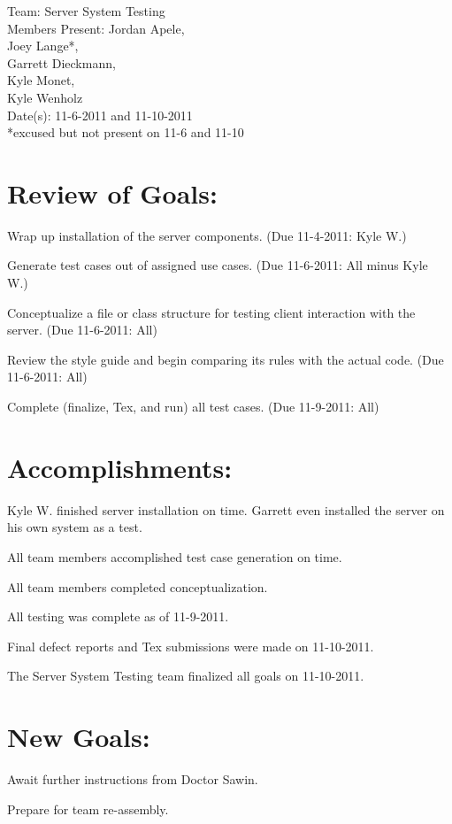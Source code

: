 \documentclass[12pt]{article}
\newenvironment{itemize*}%
{\begin{itemize}%
    \setlength{\parsep}{0pt}
    \setlength{\itemsep}{0pt}%
    \setlength{\parskip}{0pt}}%
{\end{itemize}}
\begin{document}
\thispagestyle{plain}
\begin{flushleft}
\singlespacing
Team: Server System Testing\\
Members Present: Jordan Apele,\\
Joey Lange*,\\
Garrett Dieckmann,\\
Kyle Monet,\\
Kyle Wenholz\\
Date(s): 11-6-2011 and 11-10-2011\\
*excused but not present on 11-6 and 11-10
\end{flushleft}
\pagestyle{fancy}
\section*{Review of Goals:}
\begin{itemize*}
\item Wrap up installation of the server components. (Due 11-4-2011: Kyle W.)
\item Generate test cases out of assigned use cases. (Due 11-6-2011: All minus Kyle W.)
\item Conceptualize a file or class structure for testing client interaction with the server. (Due 11-6-2011: All)
\item Review the style guide and begin comparing its rules with the actual code. (Due 11-6-2011: All)
\item Complete (finalize, Tex, and run) all test cases.  (Due 11-9-2011: All)
\end{itemize*}

\section*{Accomplishments:}
\begin{itemize*}
\item Kyle W. finished server installation on time.  Garrett even installed the server on his own system as a test.
\item All team members accomplished test case generation on time.
\item All team members completed conceptualization.
\item All testing was complete as of 11-9-2011.
\item Final defect reports and Tex submissions were made on 11-10-2011.
\item The Server System Testing team finalized all goals on 11-10-2011.
\end{itemize*}

\section*{New Goals:}
\begin{itemize*}
\item Await further instructions from Doctor Sawin.
\item Prepare for team re-assembly.
\end{itemize*}
\end{document}
